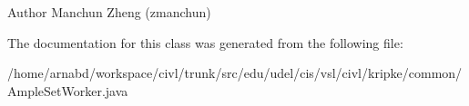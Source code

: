 \begin{DoxyPre}\begin{DoxyAuthor}{Author}
Manchun Zheng (zmanchun)

\end{DoxyAuthor}
\end{DoxyPre}


The documentation for this class was generated from the following file\+:\begin{DoxyCompactItemize}
\item 
/home/arnabd/workspace/civl/trunk/src/edu/udel/cis/vsl/civl/kripke/common/Ample\+Set\+Worker.\+java\end{DoxyCompactItemize}
